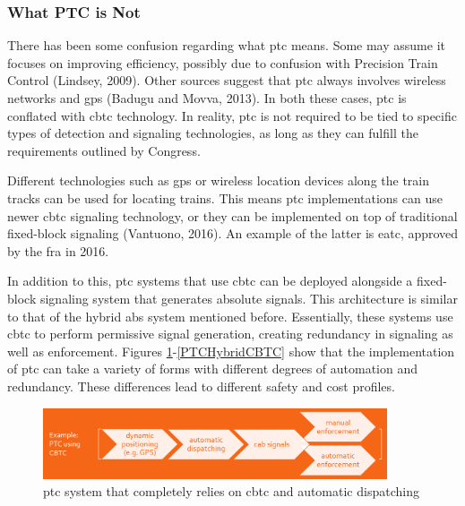 \documentclass[11pt, titlepage]{article}
\begin{document}
\subsubsection{What PTC is Not}

There has been some confusion regarding what \gls{ptc} means. Some may assume it
focuses on improving efficiency, possibly due to confusion with Precision Train
Control (Lindsey, 2009). Other sources suggest that \gls{ptc} always involves
wireless networks and \gls{gps} (Badugu and Movva, 2013). In both these cases,
\gls{ptc} is conflated with \gls{cbtc} technology. In reality, \gls{ptc} is not
required to be tied to specific types of detection and signaling technologies, as
long as they can fulfill the requirements outlined by Congress.

Different technologies such as \gls{gps} or wireless location devices along the
train tracks can be used for locating trains. This means \gls{ptc} implementations
can use newer \gls{cbtc} signaling technology, or they can be implemented on top of
traditional fixed-block signaling (Vantuono, 2016). An example of the latter is
\gls{eatc}, approved by the \gls{fra} in 2016.

In addition to this, \gls{ptc} systems that use \gls{cbtc} can be deployed alongside
a fixed-block signaling system that generates absolute signals. This architecture is
similar to that of the hybrid \gls{abs} system mentioned before. Essentially, these
systems use \gls{cbtc} to perform permissive signal generation, creating redundancy
in signaling as well as enforcement. Figures \ref{PTCwithCBTC}-\ref{PTCHybridCBTC}
show that the implementation of \gls{ptc} can take a variety of forms with
different degrees of automation and redundancy. These differences lead to different
safety and cost profiles.

\begin{figure}[ht]
    \begin{center}
        \includegraphics[width=4in]{PTCwithCBTC.png}
        \caption[PTC with CBTC]{\gls{ptc} system that completely relies on \gls{cbtc}
        and automatic dispatching}
        \label{PTCwithCBTC}
    \end{center}
\end{figure}
\end{document}
